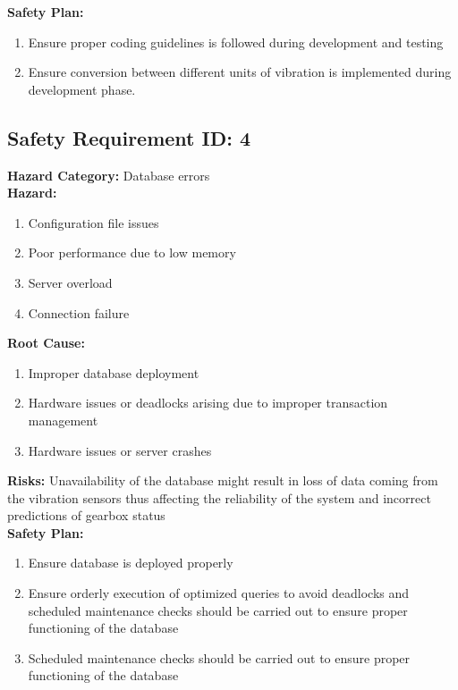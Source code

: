 \textbf{Safety Plan:}
\begin{enumerate}
	\item Ensure proper coding guidelines is followed during development and testing
	\item Ensure conversion between different units of vibration is implemented during development phase.
\end{enumerate}

\subsection{Safety Requirement ID: 4}		
\textbf{Hazard Category:} Database errors \\
\textbf{Hazard:}
\begin{enumerate}
	\item Configuration file issues
	\item Poor performance due to low memory
	\item Server overload
	\item Connection failure
\end{enumerate}
\textbf{Root Cause:}
\begin{enumerate}
	\item Improper database deployment
	\item Hardware issues or deadlocks arising due to improper transaction management
	\item Hardware issues or server crashes
\end{enumerate}
\textbf{Risks:} Unavailability of the database might result in loss of data coming from the vibration sensors thus affecting the reliability of the system and incorrect predictions of gearbox status\\
\textbf{Safety Plan:}
\begin{enumerate}
	\item Ensure database is deployed properly
	\item Ensure orderly execution of optimized queries to avoid deadlocks and scheduled maintenance checks should be carried out to ensure proper functioning of the database
	\item Scheduled maintenance checks should be carried out to ensure proper functioning of the database
\end{enumerate}

